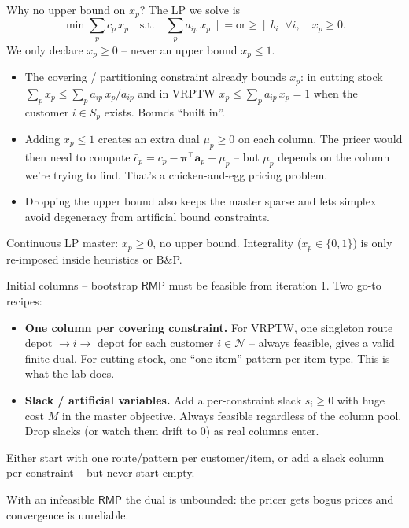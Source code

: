 \documentclass[10pt,aspectratio=169]{beamer}
\newcommand{\transpose}{^{\!\top}}
\newcommand{\rmp}{\mathsf{RMP}}
\newcommand{\redcost}{\bar{c}}
\begin{document}
\begin{frame}{Why no upper bound on $x_p$?}
  The LP we solve is
  \[
     \min \sum_p c_p\, x_p \quad
     \text{s.t.}\quad \sum_p a_{ip}\, x_p\;[\!=\!\text{or}\!\ge\!]\;b_i\;\;\forall i,\quad
     x_p \ge 0.
  \]
  We only declare $x_p\!\ge\!0$ -- \alert{never} an upper bound $x_p\!\le\!1$.

  \begin{itemize}\small
    \item The covering / partitioning constraint \alert{already bounds}
          $x_p$: in cutting stock $\sum_p x_p \le \sum_p a_{ip}\,x_p/a_{ip}$
          and in VRPTW $x_p\le \sum_p a_{ip}\,x_p = 1$ when the customer
          $i\in S_p$ exists. Bounds ``built in''.
    \item Adding $x_p\!\le\!1$ creates an extra dual $\mu_p\!\ge\!0$ on each
          column. The pricer would then need to compute
          $\redcost_p = c_p - \boldsymbol\pi\transpose\mathbf a_p + \mu_p$
          -- but $\mu_p$ depends on the column we're trying to find. That's
          a chicken-and-egg pricing problem.
    \item Dropping the upper bound also keeps the master sparse and lets
          simplex avoid degeneracy from artificial bound constraints.
  \end{itemize}
  \begin{keybox}[Rule]
    Continuous LP master: $x_p\!\ge\!0$, no upper bound. Integrality
    ($x_p\!\in\!\{0,1\}$) is only re-imposed inside heuristics or B\&P.
  \end{keybox}
\end{frame}

\begin{frame}{Initial columns -- bootstrap}
  $\rmp$ must be feasible from iteration 1. Two go-to recipes:
  \begin{itemize}\small
    \item \textbf{One column per covering constraint.} For VRPTW, one
          singleton route depot $\to i\to$ depot for each customer
          $i\in\mathcal N$ -- always feasible, gives a valid finite dual.
          For cutting stock, one ``one-item'' pattern per item type. This is
          what the lab does.
    \item \textbf{Slack / artificial variables.} Add a per-constraint slack
          $s_i\!\ge\!0$ with huge cost $M$ in the master objective. Always
          feasible regardless of the column pool. Drop slacks (or watch them
          drift to 0) as real columns enter.
  \end{itemize}
  \begin{keybox}
    Either start with one route/pattern per customer/item, or add a slack
    column per constraint -- but \alert{never start empty}.
  \end{keybox}
  \begin{warnbox}
    \pause With an infeasible $\rmp$ the dual is unbounded: the pricer gets bogus
    prices and convergence is unreliable.
  \end{warnbox}
\end{frame}
\end{document}
